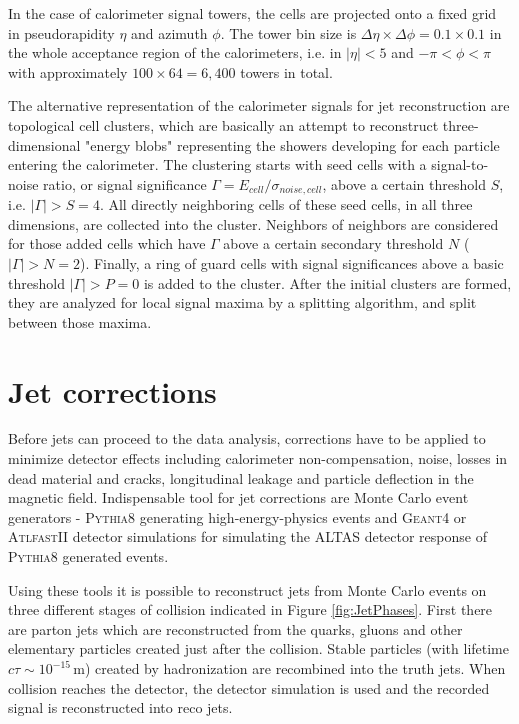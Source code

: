 In the case of calorimeter signal towers, the cells are projected onto a fixed
grid in pseudorapidity $\eta$ and azimuth $\phi$. The tower bin size is $\Delta
\eta \times \Delta \phi = 0.1 \times 0.1$ in the whole acceptance region of the
calorimeters, i.e. in $|\eta| < 5$ and $- \pi < \phi < \pi$ with approximately 
$100 \times 64 = 6,400$ towers in total.

The alternative representation of the calorimeter signals for jet
reconstruction are topological cell clusters, which are basically an attempt to
reconstruct three-dimensional "energy blobs" representing the showers developing
for each particle entering the calorimeter. The clustering starts with seed
cells with a signal-to-noise ratio, or signal significance $\Gamma = E_{cell} /
\sigma_{noise,cell}$, above a certain threshold $S$, i.e. $|\Gamma| > S = 4$.
All directly neighboring cells of these seed cells, in all three dimensions,
are collected into the cluster. Neighbors of neighbors are considered for
those added cells which have $\Gamma$ above a certain secondary threshold $N$
($|\Gamma| > N = 2$). Finally, a ring of guard cells with signal significances
above a basic threshold $|\Gamma| > P = 0$ is added to the cluster. After the
initial clusters are formed, they are analyzed for local signal maxima by a
splitting algorithm, and split between those maxima.

\section{Jet corrections}

Before jets can proceed to the data analysis, corrections have to be applied to
minimize detector effects including calorimeter non-compensation, noise, losses
in dead material and cracks, longitudinal leakage and particle deflection in the
magnetic field. Indispensable tool for jet corrections are Monte Carlo event
generators - \textsc{Pythia8} \cite{Pythia8} generating high-energy-physics
events and \textsc{Geant4} \cite{Geant4} or \textsc{AtlfastII} \cite{AtlfastII}
detector simulations for simulating the ALTAS detector response of
\textsc{Pythia8} generated events.

Using these tools it is possible to reconstruct jets from Monte Carlo events on three
different stages of collision indicated in Figure \ref{fig:JetPhases}. First
there are parton jets which are reconstructed from the quarks, gluons and other
elementary particles created just after the collision. Stable particles (with
lifetime $c\tau \sim 10^{-15}\,\text{m}$) created by hadronization are recombined into
the truth jets. When collision reaches the detector, the detector simulation
is used and the recorded signal is reconstructed into reco jets.

